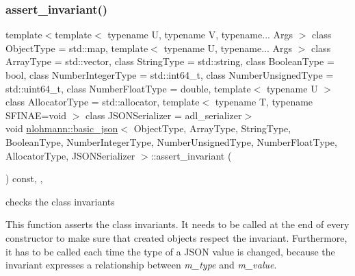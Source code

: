\subsubsection{\texorpdfstring{assert\+\_\+invariant()}{assert\_invariant()}}
{\footnotesize\ttfamily template$<$template$<$ typename U, typename V, typename... Args $>$ class Object\+Type = std\+::map, template$<$ typename U, typename... Args $>$ class Array\+Type = std\+::vector, class String\+Type  = std\+::string, class Boolean\+Type  = bool, class Number\+Integer\+Type  = std\+::int64\+\_\+t, class Number\+Unsigned\+Type  = std\+::uint64\+\_\+t, class Number\+Float\+Type  = double, template$<$ typename U $>$ class Allocator\+Type = std\+::allocator, template$<$ typename T, typename S\+F\+I\+N\+A\+E=void $>$ class J\+S\+O\+N\+Serializer = adl\+\_\+serializer$>$ \\
void \mbox{\hyperlink{classnlohmann_1_1basic__json}{nlohmann\+::basic\+\_\+json}}$<$ Object\+Type, Array\+Type, String\+Type, Boolean\+Type, Number\+Integer\+Type, Number\+Unsigned\+Type, Number\+Float\+Type, Allocator\+Type, J\+S\+O\+N\+Serializer $>$\+::assert\+\_\+invariant (\begin{DoxyParamCaption}{ }\end{DoxyParamCaption}) const\hspace{0.3cm}{\ttfamily [inline]}, {\ttfamily [private]}, {\ttfamily [noexcept]}}



checks the class invariants 

This function asserts the class invariants. It needs to be called at the end of every constructor to make sure that created objects respect the invariant. Furthermore, it has to be called each time the type of a J\+S\+ON value is changed, because the invariant expresses a relationship between {\itshape m\+\_\+type} and {\itshape m\+\_\+value}. \mbox{\label{classnlohmann_1_1basic__json_a73ae333487310e3302135189ce8ff5d8}} 

